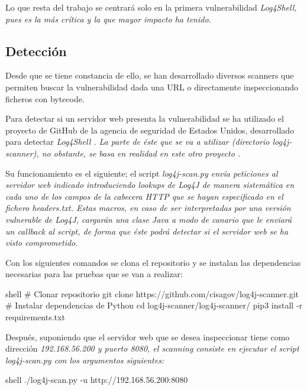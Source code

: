 \documentclass[../main.tex]{subfiles}
\begin{document}
Lo que resta del trabajo se centrará solo en la primera vulnerabilidad \it{Log4Shell}, pues es la más crítica y la que mayor impacto ha tenido.

\subsection{Detección}

Desde que se tiene constancia de ello, se han desarrollado diversos scanners que permiten buscar la vulnerabilidad dada una URL o directamente inspeccionando ficheros con bytecode.

Para detectar si un servidor web presenta la vulnerabilidad se ha utilizado el proyecto de GitHub de la agencia de seguridad de Estados Unidos, desarrollado para detectar \it{Log4Shell} \cite{scanner-cisagov}. La parte de éste que se va a utilizar (directorio \it{log4j-scanner}), no obstante, se basa en realidad en este otro proyecto \cite{scanner-cisagov-original}.

Su funcionamiento es el siguiente; el script \it{log4j-scan.py} envía peticiones al servidor web indicado introduciendo \it{lookups} de \it{Log4J} de manera sistemática en cada uno de los campos de la cabecera HTTP que se hayan especificado en el fichero \it{headers.txt}. Estas macros, en caso de ser interpretadas por una versión vulnerable de \it{Log4J}, cargarán una clase Java a modo de canario que le enviará un callback al script, de forma que éste podrá detectar si el servidor web se ha visto comprometido.

Con los siguientes comandos se clona el repositorio y se instalan las dependencias necesarias para las pruebas que se van a realizar:
\begin{codigo}{shell}
# Clonar repositorio
git clone https://github.com/cisagov/log4j-scanner.git
# Instalar dependencias de Python
cd log4j-scanner/log4j-scanner/
pip3 install -r requirements.txt
\end{codigo}

Después, suponiendo que el servidor web que se desea inspeccionar tiene como dirección \it{192.168.56.200} y puerto \it{8080}, el scanning consiste en ejecutar el script \it{log4j-scan.py} con los argumentos siguientes:
\begin{codigo}{shell}
./log4j-scan.py -u http://192.168.56.200:8080
\end{codigo}
\end{document}

